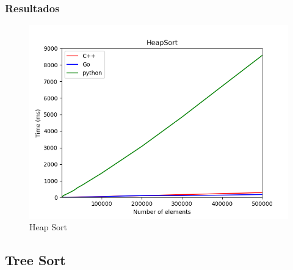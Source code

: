 \documentclass[
	11pt, %
]{beamer}
\begin{document}
\begin{frame}
	\frametitle{Resultados}
	
	\begin{figure}
		\includegraphics[width=0.8\linewidth]{HeapSort_1.png}
		\caption{Heap Sort}
	\end{figure}
\end{frame}

\subsection{Tree Sort}
\end{document}
